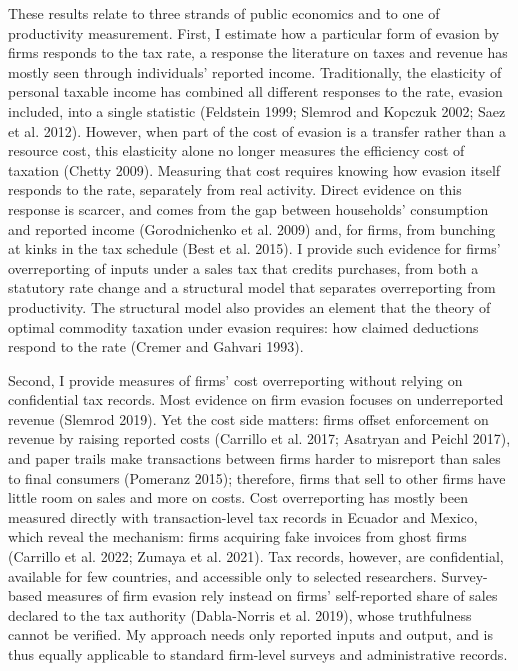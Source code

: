 \documentclass[
  12pt,
  letterpaper,
  oneside,
  openany]{report}
\begin{document}
These results relate to three strands of public economics and to one of
productivity measurement. First, I estimate how a particular form of
evasion by firms responds to the tax rate, a response the literature on
taxes and revenue has mostly seen through individuals' reported income.
Traditionally, the elasticity of personal taxable income has combined
all different responses to the rate, evasion included, into a single
statistic (Feldstein 1999; Slemrod and Kopczuk 2002; Saez et al. 2012).
However, when part of the cost of evasion is a transfer rather than a
resource cost, this elasticity alone no longer measures the efficiency
cost of taxation (Chetty 2009). Measuring that cost requires knowing how
evasion itself responds to the rate, separately from real activity.
Direct evidence on this response is scarcer, and comes from the gap
between households' consumption and reported income (Gorodnichenko et
al. 2009) and, for firms, from bunching at kinks in the tax schedule
(Best et al. 2015). I provide such evidence for firms' overreporting of
inputs under a sales tax that credits purchases, from both a statutory
rate change and a structural model that separates overreporting from
productivity. The structural model also provides an element that the
theory of optimal commodity taxation under evasion requires: how claimed
deductions respond to the rate (Cremer and Gahvari 1993).

Second, I provide measures of firms' cost overreporting without relying
on confidential tax records. Most evidence on firm evasion focuses on
underreported revenue (Slemrod 2019). Yet the cost side matters: firms
offset enforcement on revenue by raising reported costs (Carrillo et al.
2017; Asatryan and Peichl 2017), and paper trails make transactions
between firms harder to misreport than sales to final consumers
(Pomeranz 2015); therefore, firms that sell to other firms have little
room on sales and more on costs. Cost overreporting has mostly been
measured directly with transaction-level tax records in Ecuador and
Mexico, which reveal the mechanism: firms acquiring fake invoices from
ghost firms (Carrillo et al. 2022; Zumaya et al. 2021). Tax records,
however, are confidential, available for few countries, and accessible
only to selected researchers. Survey-based measures of firm evasion rely
instead on firms' self-reported share of sales declared to the tax
authority (Dabla-Norris et al. 2019), whose truthfulness cannot be
verified. My approach needs only reported inputs and output, and is thus
equally applicable to standard firm-level surveys and administrative
records.
\end{document}
